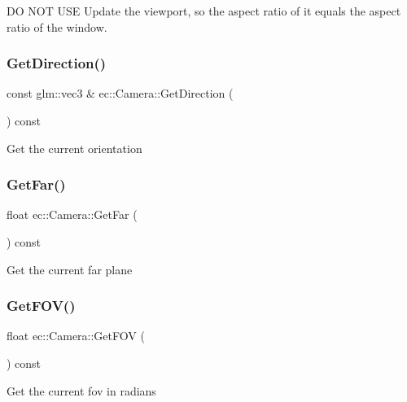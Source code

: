 DO N\+OT U\+SE Update the viewport, so the aspect ratio of it equals the aspect ratio of the window. \mbox{\label{classec_1_1_camera_a45373436f96d65d84fa77157cf5d80d2}} 
\subsubsection{\texorpdfstring{Get\+Direction()}{GetDirection()}}
{\footnotesize\ttfamily const glm\+::vec3 \& ec\+::\+Camera\+::\+Get\+Direction (\begin{DoxyParamCaption}{ }\end{DoxyParamCaption}) const}

Get the current orientation \mbox{\label{classec_1_1_camera_a5bdbf9c5001e666bed13a5c75fd1c88f}} 
\subsubsection{\texorpdfstring{Get\+Far()}{GetFar()}}
{\footnotesize\ttfamily float ec\+::\+Camera\+::\+Get\+Far (\begin{DoxyParamCaption}{ }\end{DoxyParamCaption}) const}

Get the current far plane \mbox{\label{classec_1_1_camera_a076c35547c2e64166ac3307b13292131}} 
\subsubsection{\texorpdfstring{Get\+F\+O\+V()}{GetFOV()}}
{\footnotesize\ttfamily float ec\+::\+Camera\+::\+Get\+F\+OV (\begin{DoxyParamCaption}{ }\end{DoxyParamCaption}) const}

Get the current fov in radians \mbox{\label{classec_1_1_camera_abf0024083abfe06c0e5de606ee2b8912}} 
